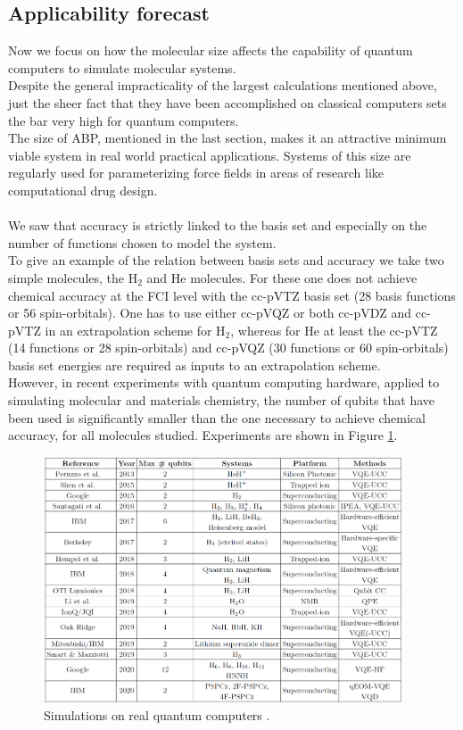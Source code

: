 \subsection{Applicability forecast}
Now we focus on how the molecular size affects the capability of quantum computers to simulate molecular systems. \\
Despite the general impracticality of the largest calculations mentioned above, just the sheer fact that they have been accomplished on classical computers sets the bar very high for quantum computers. \\
The size of ABP, mentioned in the last section, makes it an attractive minimum viable system in real world practical applications. Systems of this size are regularly used for parameterizing force fields in areas of research like computational drug design. \\
\\
We saw that accuracy is strictly linked to the basis set and especially on the number of functions chosen to model the system. \\
To give an example of the relation between basis sets and accuracy we take two simple molecules, the H$_2$ and He molecules. For these one does not achieve chemical accuracy at the FCI level with the cc-pVTZ basis set (28 basis functions or 56 spin-orbitals). One has to use either cc-pVQZ or both cc-pVDZ and cc-pVTZ in an extrapolation scheme for H$_2$, whereas for He at least the cc-pVTZ (14 functions or 28 spin-orbitals) and cc-pVQZ (30 functions or 60 spin-orbitals) basis set energies are required as inputs to an extrapolation scheme. \\
However, in recent experiments with quantum computing hardware, applied to simulating molecular and materials chemistry, the number of qubits that have been used is significantly smaller than the one necessary to achieve chemical accuracy, for all molecules studied. Experiments are shown in Figure \ref{Experiments with quantum computers}. \\
\begin{figure}[ht]
  \centering
  \includegraphics[width=0.95\textwidth]{figures/Experiments with quantum computers.png}
  \caption{Simulations on real quantum computers \cite{Elfving2020Sep}.} \label{Experiments with quantum computers}
\end{figure} \\
